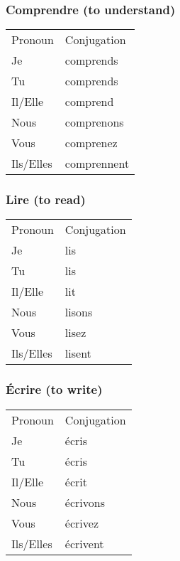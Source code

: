 \subsubsection{Comprendre (to understand)}
\begin{tabular}{| l | l |}
\hline
Pronoun 	& 	Conjugation	\\
Je		&	comprends	\\
Tu		&	comprends	\\
Il/Elle		&	comprend	\\
Nous		&	comprenons	\\
Vous		&	comprenez	\\
Ils/Elles	&	comprennent	\\
\hline
\end{tabular}

\subsubsection{Lire (to read)}
\begin{tabular}{| l | l |}
\hline
Pronoun 	& 	Conjugation	\\
Je		&	lis		\\
Tu		&	lis		\\
Il/Elle		&	lit		\\
Nous		&	lisons		\\
Vous		&	lisez		\\
Ils/Elles	&	lisent		\\
\hline
\end{tabular}

\subsubsection{\'Ecrire (to write)}
\begin{tabular}{| l | l |}
\hline
Pronoun 	& 	Conjugation	\\
Je		&	\'ecris		\\
Tu		&	\'ecris		\\
Il/Elle		&	\'ecrit		\\
Nous		&	\'ecrivons	\\
Vous		&	\'ecrivez	\\
Ils/Elles	&	\'ecrivent	\\
\hline
\end{tabular}
